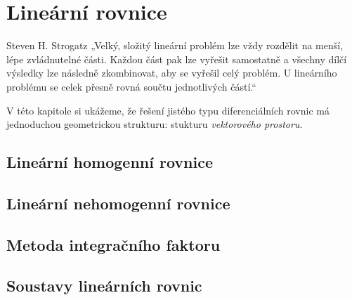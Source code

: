 \chapter{Lineární rovnice}
\begin{chapquote}{Steven H. Strogatz}%
 „Velký, složitý lineární problém lze vždy rozdělit na menší, lépe zvládnutelné části. Každou část pak lze vyřešit samostatně a všechny dílčí výsledky lze následně zkombinovat, aby se vyřešil celý problém. U lineárního problému se celek přesně rovná součtu jednotlivých částí.“
\end{chapquote}
V této kapitole si ukážeme, že řešení jistého typu diferenciálních rovnic má jednoduchou geometrickou strukturu: stukturu \emph{vektorového prostoru}.
\section{Lineární homogenní rovnice}
\section{Lineární nehomogenní rovnice}
\section{Metoda integračního faktoru}
\section{Soustavy lineárních rovnic}
